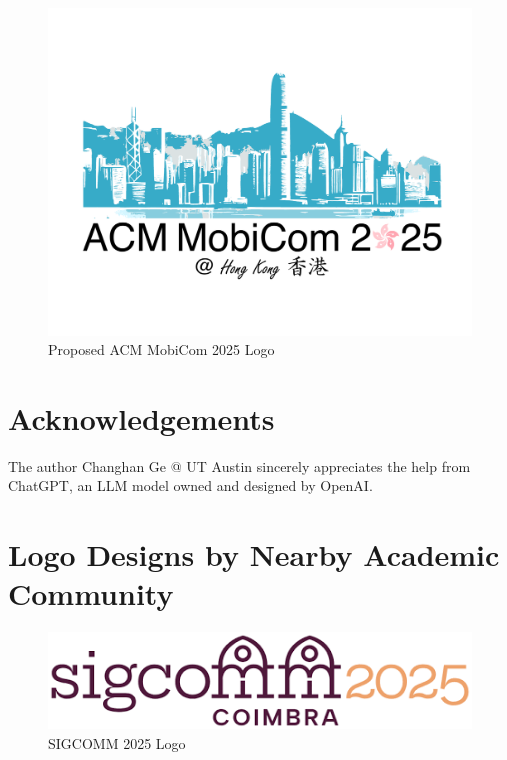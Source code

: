 \documentclass[sigconf, 10pt]{acmart}
\begin{document}
\begin{figure}[h]
	
	\centering
	\includegraphics[width=\columnwidth, clip=true, trim=2cm 3cm 2cm 4cm]{../logo/mobicom25_logo.pdf}
	\caption{Proposed ACM MobiCom 2025 Logo}
	\label{fig:logo}
\end{figure}


\vspace{-3pt}
\section*{Acknowledgements}
\vspace{-3pt}
The author Changhan Ge @ UT Austin sincerely appreciates the help from ChatGPT, an LLM model owned and designed by OpenAI.

\appendix
\section{Logo Designs by Nearby Academic Community}
\begin{figure}[h]
	\centering
	\includegraphics[width=\columnwidth]{./appendix/sigcomm25-logo.png}
	\caption{SIGCOMM 2025 Logo}
	\label{fig:sigcomm25logo}
\end{figure}
\end{document}
